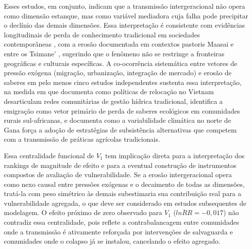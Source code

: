 Esses estudos, em conjunto, indicam que a transmissão intergeracional não opera como dimensão estanque, mas como variável mediadora cuja falha pode precipitar o declínio das demais dimensões. Essa interpretação é consistente com evidências longitudinais de perda de conhecimento tradicional em sociedades contemporâneas \cite{ReyesGarcia2013evidence}, com a erosão documentada em contextos pastoris Maasai \cite{HedgesKipila2020} e entre os Tsimane' \cite{Gruberg2022}, sugerindo que o fenômeno não se restringe a fronteiras geográficas e culturais específicas. A co-ocorrência sistemática entre vetores de pressão exógena (migração, urbanização, integração de mercado) e erosão de saberes em pelo menos cinco estudos independentes \cite{Tran2025,Moller2023,Bastos2022,VazquezDelfin2022,Aniah2019} sustenta essa interpretação, na medida em que  documenta como políticas de relocação no Vietnam desarticulam redes comunitárias de gestão hídrica tradicional,  identifica a emigração como vetor primário de perda de saberes ecológicos em comunidades rurais sul-africanas, e  documenta como a variabilidade climática no norte de Gana força a adoção de estratégias de subsistência alternativas que competem com a transmissão de práticas agrícolas tradicionais.

Essa centralidade funcional de $V_1$ tem implicação direta para a interpretação dos rankings de magnitude de efeito e para a eventual construção de instrumentos compostos de avaliação de vulnerabilidade. Se a erosão intergeracional opera como nexo causal entre pressões exógenas e o decaimento de todas as dimensões, tratá-la com peso simétrico às demais subestimaria sua contribuição real para a vulnerabilidade agregada, o que deve ser considerado em estudos subsequentes de modelagem. O efeito próximo de zero observado para $V_1$ ($\overline{lnRR} = -0{,}017$) não contradiz essa centralidade, pois reflete a contrabalancagem entre comunidades onde a transmissão é ativamente reforçada por intervenções de salvaguarda e comunidades onde o colapso já se instalou, cancelando o efeito agregado.

